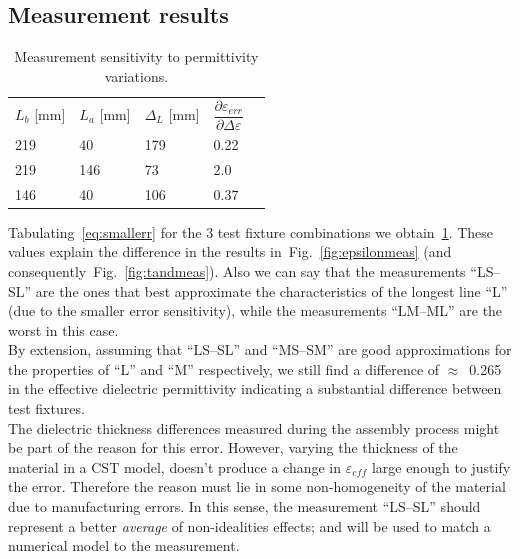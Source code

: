 \documentclass[11pt,a4paper]{article}
\newcommand{\fig}[1]{Fig.~\ref{#1}}
\newcommand{\laser}[1]{``#1''}
\begin{document}
    \subsection{Measurement results}
    \label{subsec:measure-error}
    \begin{table}[!ht]
        \centering
        \begin{tabular}{|l|l|l|l|l}
            \cline{1-4}
            $L_b$ {[}mm{]} & $L_a$ {[}mm{]} & $\Delta_L$ {[}mm{]} & $\dfrac{\partial \varepsilon_{err}}{\partial \Delta\varepsilon}$  \rule[-4mm]{0mm}{11mm}&  \\ \cline{1-4}
            219            & 40             & 179                 & 0.22                                                             & \\ \cline{1-4}
            219            & 146            & 73                  & 2.0                                                              & \\ \cline{1-4}
            146            & 40             & 106                 & 0.37                                                             & \\ \cline{1-4}
        \end{tabular}
        \caption{Measurement sensitivity to permittivity variations.}
        \label{tab:errorsensitivity}
    \end{table}
    Tabulating~\eqref{eq:smallerr} for the 3 test fixture combinations we obtain~\ref{tab:errorsensitivity}.
    These values explain the difference in the results in~\fig{fig:epsilonmeas} (and consequently~\fig{fig:tandmeas}).
    Also we can say that the measurements \laser{LS--SL} are the ones that best approximate the characteristics of the
    longest line \laser{L} (due to the smaller error sensitivity), while the measurements \laser{LM--ML} are the worst
    in this case.\\
    By extension, assuming that \laser{LS--SL} and \laser{MS--SM} are good approximations for the properties of
    \laser{L} and \laser{M} respectively, we still find a difference of $\approx$~0.265 in the effective dielectric
    permittivity indicating a substantial difference between test fixtures.\\
    The dielectric thickness differences measured during the assembly process might be part of the reason for this error.
    However, varying the thickness of the material in a CST model, doesn't produce a change in $\varepsilon_{eff}$
    large enough to justify the error.
    Therefore the reason must lie in some non-homogeneity of the material due to manufacturing errors.
    In this sense, the measurement \laser{LS--SL} should represent a better \emph{average} of non-idealities effects;
    and will be used to match a numerical model to the measurement.
\end{document}
